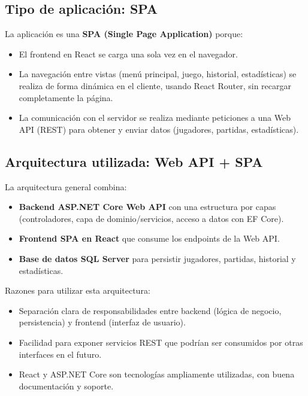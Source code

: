\documentclass[11pt,a4paper]{article}
\begin{document}
\subsection{Tipo de aplicación: SPA}

La aplicación es una \textbf{SPA (Single Page Application)} porque:
\begin{itemize}
    \item El frontend en React se carga una sola vez en el navegador.
    \item La navegación entre vistas (menú principal, juego, historial, estadísticas) se realiza de forma dinámica en el cliente,
          usando React Router, sin recargar completamente la página.
    \item La comunicación con el servidor se realiza mediante peticiones a una Web API (REST) para obtener y enviar datos (jugadores, partidas, estadísticas).
\end{itemize}

\subsection{Arquitectura utilizada: Web API + SPA}

La arquitectura general combina:
\begin{itemize}
    \item \textbf{Backend ASP.NET Core Web API} con una estructura por capas (controladores, capa de dominio/servicios, acceso a datos con EF Core).
    \item \textbf{Frontend SPA en React} que consume los endpoints de la Web API.
    \item \textbf{Base de datos SQL Server} para persistir jugadores, partidas, historial y estadísticas.
\end{itemize}

Razones para utilizar esta arquitectura:
\begin{itemize}
    \item Separación clara de responsabilidades entre backend (lógica de negocio, persistencia) y frontend (interfaz de usuario).
    \item Facilidad para exponer servicios REST que podrían ser consumidos por otras interfaces en el futuro.
    \item React y ASP.NET Core son tecnologías ampliamente utilizadas, con buena documentación y soporte.
\end{itemize}

\end{document}
